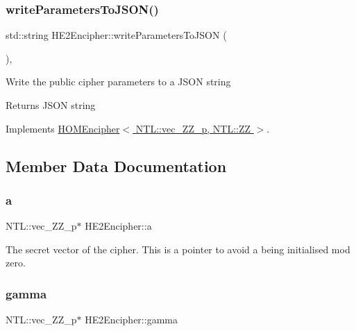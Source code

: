 \subsubsection{\texorpdfstring{write\+Parameters\+To\+J\+S\+O\+N()}{writeParametersToJSON()}}
{\footnotesize\ttfamily std\+::string H\+E2\+Encipher\+::write\+Parameters\+To\+J\+S\+ON (\begin{DoxyParamCaption}{ }\end{DoxyParamCaption})\hspace{0.3cm}{\ttfamily [override]}, {\ttfamily [virtual]}}

Write the public cipher parameters to a J\+S\+ON string \begin{DoxyReturn}{Returns}
J\+S\+ON string 
\end{DoxyReturn}


Implements \hyperlink{classHOMEncipher_abf176e3fb85de6f0f6a2c96563397d39}{H\+O\+M\+Encipher$<$ N\+T\+L\+::vec\+\_\+\+Z\+Z\+\_\+p, N\+T\+L\+::\+Z\+Z $>$}.



\subsection{Member Data Documentation}
\mbox{\label{classHE2Encipher_a84192e155c19195867671fa085f9c73c}} 
\subsubsection{\texorpdfstring{a}{a}}
{\footnotesize\ttfamily N\+T\+L\+::vec\+\_\+\+Z\+Z\+\_\+p$\ast$ H\+E2\+Encipher\+::a\hspace{0.3cm}{\ttfamily [protected]}}

The secret vector of the cipher. This is a pointer to avoid a being initialised mod zero. \mbox{\label{classHE2Encipher_acb629492d1edb07e4ac6d2dca60c582a}} 
\subsubsection{\texorpdfstring{gamma}{gamma}}
{\footnotesize\ttfamily N\+T\+L\+::vec\+\_\+\+Z\+Z\+\_\+p$\ast$ H\+E2\+Encipher\+::gamma\hspace{0.3cm}{\ttfamily [protected]}}

